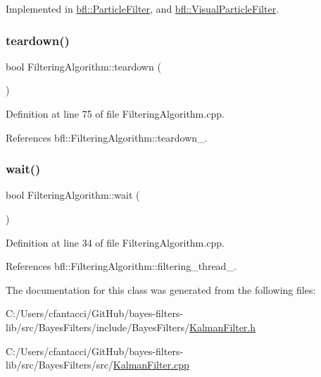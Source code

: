 Implemented in \mbox{\hyperlink{classbfl_1_1ParticleFilter_a2d7a5e7aaad179037273d35be229056d}{bfl\+::\+Particle\+Filter}}, and \mbox{\hyperlink{classbfl_1_1VisualParticleFilter_aab68e455c645bc1b7b8c3c2b476c2f9c}{bfl\+::\+Visual\+Particle\+Filter}}.

\mbox{\label{classbfl_1_1FilteringAlgorithm_a1dc912d89ee8f96d4f3e8209865c5308}} 
\subsubsection{\texorpdfstring{teardown()}{teardown()}}
{\footnotesize\ttfamily bool Filtering\+Algorithm\+::teardown (\begin{DoxyParamCaption}{ }\end{DoxyParamCaption})\hspace{0.3cm}{\ttfamily [inherited]}}



Definition at line 75 of file Filtering\+Algorithm.\+cpp.



References bfl\+::\+Filtering\+Algorithm\+::teardown\+\_\+.

\mbox{\label{classbfl_1_1FilteringAlgorithm_a40372c24fa050eb0274371172df0a244}} 
\subsubsection{\texorpdfstring{wait()}{wait()}}
{\footnotesize\ttfamily bool Filtering\+Algorithm\+::wait (\begin{DoxyParamCaption}{ }\end{DoxyParamCaption})\hspace{0.3cm}{\ttfamily [inherited]}}



Definition at line 34 of file Filtering\+Algorithm.\+cpp.



References bfl\+::\+Filtering\+Algorithm\+::filtering\+\_\+thread\+\_\+.



The documentation for this class was generated from the following files\+:\begin{DoxyCompactItemize}
\item 
C\+:/\+Users/cfantacci/\+Git\+Hub/bayes-\/filters-\/lib/src/\+Bayes\+Filters/include/\+Bayes\+Filters/\mbox{\hyperlink{KalmanFilter_8h}{Kalman\+Filter.\+h}}\item 
C\+:/\+Users/cfantacci/\+Git\+Hub/bayes-\/filters-\/lib/src/\+Bayes\+Filters/src/\mbox{\hyperlink{KalmanFilter_8cpp}{Kalman\+Filter.\+cpp}}\end{DoxyCompactItemize}
